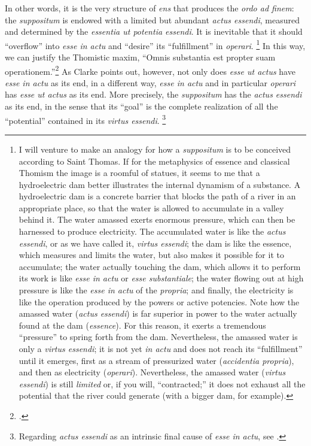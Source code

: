 %
In other words, it is the very structure of \emph{ens} that produces the \emph{ordo ad finem}: the \emph{suppositum} is endowed with a limited but abundant \emph{actus essendi}, measured and determined by the \emph{essentia ut potentia essendi}. It is inevitable that it should ``overflow'' into \emph{esse in actu} and ``desire'' its ``fulfillment'' in \emph{operari}.%
%
\footnote{I will venture to make an analogy for how a \emph{suppositum} is to be conceived according to Saint Thomas. If for the metaphysics of essence and classical Thomism the image is a roomful of statues, it seems to me that a hydroelectric dam better illustrates the internal dynamism of a substance. A hydroelectric dam is a concrete barrier that blocks the path of a river in an appropriate place, so that the water is allowed to accumulate in a valley behind it. The water amassed exerts enormous pressure, which can then be harnessed to produce electricity. The accumulated water is like the \emph{actus essendi}, or as we have called it, \emph{virtus essendi}; the dam is like the essence, which measures and limits the water, but also makes it possible for it to accumulate; the water actually touching the dam, which allows it to perform its work is like \emph{esse in actu} or \emph{esse substantiale}; the water flowing out at high pressure is like the \emph{esse in actu} of the \emph{propria}; and finally, the electricity is like the operation produced by the powers or active potencies. Note how the amassed water (\emph{actus essendi}) is far superior in power to the water actually found at the dam (\emph{essence}). For this reason, it exerts a tremendous ``pressure'' to spring forth from the dam. Nevertheless, the amassed water is only a \emph{virtus essendi}; it is not yet \emph{in actu} and does not reach its ``fulfillment'' until it emerges, first as a stream of pressurized water (\emph{accidentia propria}), and then as electricity (\emph{operari}). Nevertheless, the amassed water (\emph{virtus essendi}) is still \emph{limited} or, if you will, ``contracted;'' it does not exhaust all the potential that the river could generate (with a bigger dam, for example).}
%
In this way, we can justify the Thomistic maxim, ``Omnis substantia est propter suam operationem.''\footcite[I, cap.~45, n.~6 (Marietti n.~387)]{st:contragent} As Clarke points out, however, not only does \emph{esse ut actus} have \emph{esse in actu} as its end, in a different way, \emph{esse in actu} and in particular \emph{operari} has \emph{esse ut actus} as its end. More precisely, the \emph{suppositum} has the \emph{actus essendi} as its end, in the sense that its ``goal'' is the complete realization of all the ``potential'' contained in its \emph{virtus essendi}.%
%
\footnote{Regarding \emph{actus essendi} as an intrinsic final cause of \emph{esse in actu}, see \cite[61--62]{contat:esse-essentia-ordo}.}
%

\begin{DONE}
\end{DONE}